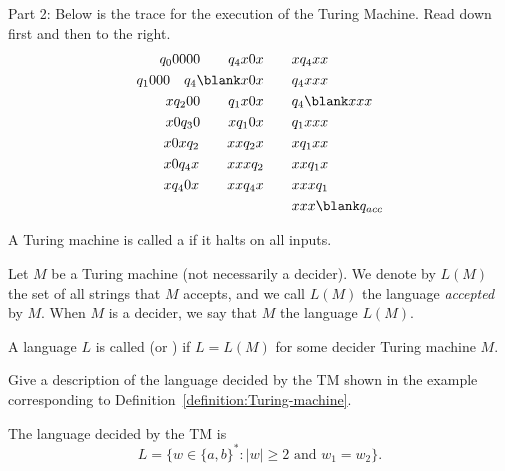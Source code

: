 \begin{flex}
\begin{solution}
\noindent
Part 2: Below is the trace for the execution of the Turing Machine. Read down first and then to the right. 
\begin{align*}
     q_00000  \qquad   q_4x0x        \qquad  & x q_4 xx  \\
     q_1000  \quad   q_4\blank x0x \qquad  & q_4 x x x  \\
     x q_200 \qquad   q_1 x0x       \qquad  &q_4 \blank  xxx  \\
     x 0q_30 \qquad   x q_1 0x      \qquad  & q_1 xxx  \\
     x 0xq_2 \qquad   xxq_2 x       \qquad  & x q_1 xx  \\
     x 0q_4x \qquad   xxxq_2        \qquad  &  xxq_1 x  \\
     x q_40x \qquad   xxq_4 x       \qquad  & xxx q_1 \\
    &  xxx \blank q_{acc} 
\end{align*}
\end{solution}
\end{flex}


\begin{definition} \label{definition:Decider-Turing-machine}
A Turing machine is called a  if it halts on all inputs.
\end{definition}


\begin{definition} \label{definition:Language-accepted-and-decided-by-a-TM}
Let $M$ be a Turing machine (not necessarily a decider). We denote by $L(M)$ the set of all strings that $M$ accepts, and we call $L(M)$ the language \emph{accepted} by $M$. When $M$ is a decider, we say that $M$  the language $L(M)$.
\end{definition}


\begin{definition} \label{definition:Decidable-language}
A language $L$ is called  (or ) if $L = L(M)$ for some decider Turing machine $M$.
\end{definition}


\begin{flex}
\begin{exercise} \label{exercise:A-simple-decidable-language}
Give a description of the language decided by the TM shown in the example corresponding to Definition~\ref{definition:Turing-machine}.
\end{exercise}

\begin{solution}
The language decided by the TM is 
\[
    L = \{w \in \{a,b\}^* : |w| \geq 2 \text{ and } w_1 = w_2\}.
\]
\end{solution}
\end{flex}


